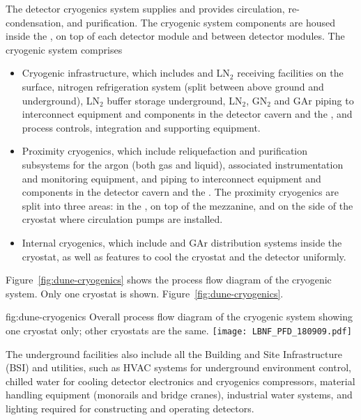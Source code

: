The detector cryogenics system supplies  and provides
circulation, re-condensation, and purification. The cryogenic system
components are housed inside the , on top of each detector module
and between detector modules. The cryogenic system comprises
\begin{itemize}
\item Cryogenic infrastructure, which includes  and LN$_2$ receiving
  facilities on the surface, nitrogen refrigeration system (split
  between above ground and underground), LN$_2$ buffer storage
  underground, LN$_2$, GN$_2$ and GAr piping to interconnect equipment and
  components in the detector cavern and the , and process controls,
  integration and supporting equipment. 
\item Proximity cryogenics, which include reliquefaction  and
  purification subsystems for the argon (both gas and liquid), associated
  instrumentation and monitoring equipment, and  piping to
  interconnect equipment and components in the detector cavern and the
  . The proximity cryogenics are split into three areas: in the
  , on top of the mezzanine, and on the side of the cryostat 
  where  circulation pumps are installed.
\item Internal cryogenics, which include  and GAr distribution
  systems inside the cryostat, as well as features to cool the
  cryostat and the detector uniformly.
\end{itemize}
Figure~\ref{fig:dune-cryogenics} shows the process flow diagram of the
 cryogenic system. Only one cryostat is shown.
Figure~\ref{fig:dune-cryogenics}.
\begin{dunefigure}{fig:dune-cryogenics}
  {Overall process flow diagram of the cryogenic system showing one
    cryostat only; other cryostats are the same.}
  \texttt{[image: LBNF\_PFD\_180909.pdf]}
\end{dunefigure}


The underground facilities also include all the Building and Site
Infrastructure (BSI)  and utilities, such as HVAC systems for
underground environment control, chilled water for cooling detector
electronics and cryogenics compressors, material handling equipment
(monorails and bridge cranes), industrial water systems, and lighting required for constructing and operating detectors.


